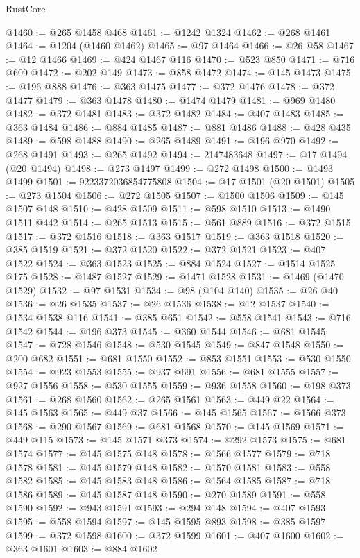 \begin{lexlean}{RustCore}
\begin{coremodule}
@1460 := @265 @1458 @468
@1461 := @1242 @1324
@1462 := @268 @1461
@1464 := @1204 (@1460 @1462)
@1465 := @97 @1464
@1466 := @26 @58
@1467 := @12 @1466
@1469 := @424 @1467 @116
@1470 := @523 @850
@1471 := @716 @609
@1472 := @202 @149
@1473 := @858 @1472
@1474 := @145 @1473
@1475 := @196 @888
@1476 := @363 @1475
@1477 := @372 @1476
@1478 := @372 @1477
@1479 := @363 @1478
@1480 := @1474 @1479
@1481 := @969 @1480
@1482 := @372 @1481
@1483 := @372 @1482
@1484 := @407 @1483
@1485 := @363 @1484
@1486 := @884 @1485
@1487 := @881 @1486
@1488 := @428 @435
@1489 := @598 @1488
@1490 := @265 @1489
@1491 := @196 @970
@1492 := @268 @1491
@1493 := @265 @1492
@1494 := 2147483648
@1497 := @17 @1494 (@20 @1494)
@1498 := @273 @1497
@1499 := @272 @1498
@1500 := @1493 @1499
@1501 := 9223372036854775808
@1504 := @17 @1501 (@20 @1501)
@1505 := @273 @1504
@1506 := @272 @1505
@1507 := @1500 @1506
@1509 := @145 @1507 @148
@1510 := @428 @1509
@1511 := @598 @1510
@1513 := @1490 @1511 @442
@1514 := @265 @1513
@1515 := @561 @889
@1516 := @372 @1515
@1517 := @372 @1516
@1518 := @363 @1517
@1519 := @363 @1518
@1520 := @385 @1519
@1521 := @372 @1520
@1522 := @372 @1521
@1523 := @407 @1522
@1524 := @363 @1523
@1525 := @884 @1524
@1527 := @1514 @1525 @175
@1528 := @1487 @1527
@1529 := @1471 @1528
@1531 := @1469 (@1470 @1529)
@1532 := @97 @1531
@1534 := @98 (@104 @140)
@1535 := @26 @40
@1536 := @26 @1535
@1537 := @26 @1536
@1538 := @12 @1537
@1540 := @1534 @1538 @116
@1541 := @385 @651
@1542 := @558 @1541
@1543 := @716 @1542
@1544 := @196 @373
@1545 := @360 @1544
@1546 := @681 @1545
@1547 := @728 @1546
@1548 := @530 @1545
@1549 := @847 @1548
@1550 := @200 @682
@1551 := @681 @1550
@1552 := @853 @1551
@1553 := @530 @1550
@1554 := @923 @1553
@1555 := @937 @691
@1556 := @681 @1555
@1557 := @927 @1556
@1558 := @530 @1555
@1559 := @936 @1558
@1560 := @198 @373
@1561 := @268 @1560
@1562 := @265 @1561
@1563 := @449 @22
@1564 := @145 @1563
@1565 := @449 @37
@1566 := @145 @1565
@1567 := @1566 @373
@1568 := @290 @1567
@1569 := @681 @1568
@1570 := @145 @1569
@1571 := @449 @115
@1573 := @145 @1571 @373
@1574 := @292 @1573
@1575 := @681 @1574
@1577 := @145 @1575 @148
@1578 := @1566 @1577
@1579 := @718 @1578
@1581 := @145 @1579 @148
@1582 := @1570 @1581
@1583 := @558 @1582
@1585 := @145 @1583 @148
@1586 := @1564 @1585
@1587 := @718 @1586
@1589 := @145 @1587 @148
@1590 := @270 @1589
@1591 := @558 @1590
@1592 := @943 @1591
@1593 := @294 @148
@1594 := @407 @1593
@1595 := @558 @1594
@1597 := @145 @1595 @893
@1598 := @385 @1597
@1599 := @372 @1598
@1600 := @372 @1599
@1601 := @407 @1600
@1602 := @363 @1601
@1603 := @884 @1602

\end{coremodule}
\end{lexlean}
